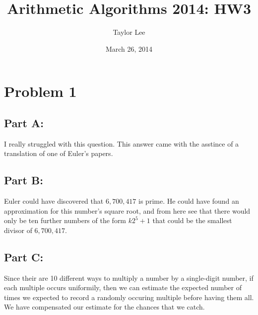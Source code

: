 \documentclass[12pt]{article}
\theoremstyle{moo}
\begin{document}
\fontseries {\seriesdefault}
\fontshape {\shapedefault}
\selectfont

\title{ Arithmetic Algorithms 2014: HW3}
\date{March 26, 2014}         %
\author{Taylor Lee}      %
\maketitle                      %




\section*{Problem 1}


\subsection*{Part A:}
I really struggled with this question. This answer came with the asstince of a translation of one of Euler's papers.

\subsection*{Part B:}
Euler could have discovered that $6,700,417$ is prime. He could have found an approximation for this number's square root, and from here see that there would only be ten further numbers of the form $k2^5+1$ that could be the smallest divisor of $6,700,417$.
\subsection*{Part C:}

Since their are 10 different ways to multiply a number by a single-digit number, if each multiple occurs uniformily, then we can estimate the expected number of times we expected to record a randomly occuring multiple before having them all. We have compensated our estimate for the chances that we catch.
\end{document}
